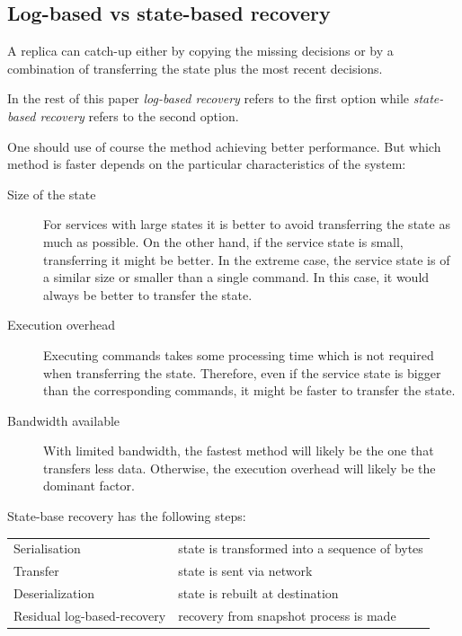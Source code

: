 \subsection{Log-based vs state-based recovery}
\label{subsec:log_based_state_based_recovery}
A replica can catch-up either by copying the missing decisions or by a combination of transferring the state plus the most recent decisions.

In the rest of this paper \emph{log-based recovery} refers to the first option while \emph{state-based recovery} refers to the second option.

One should use of course the method achieving better performance. But which method is faster depends on the particular characteristics of the system:

\begin{description}
  \item[Size of the state] For services with large states  it is better to avoid transferring the state as much as possible. On the other hand, if the service state is small, transferring it might be better. In the extreme case, the service state is of a similar size or smaller than a single command. In this case, it would always be better to transfer the state.

  \item[Execution overhead] Executing commands takes some processing time which is not required when transferring the state. Therefore, even if the service state is bigger than the corresponding commands, it might be faster to transfer the state.

  \item[Bandwidth available] With limited bandwidth, the fastest  method will likely be the one that transfers less data. Otherwise, the execution overhead will likely be the dominant factor.
\end{description}


State-base recovery has the following steps:

\begin{center}
  \begin{tabular}{ll}
    Serialisation               & state is transformed into a sequence of bytes \\
    Transfer                    & state is sent via network \\
    Deserialization             & state is rebuilt at destination \vspace{0.5em} \\
    Residual log-based-recovery & recovery from snapshot process is made \\
  \end{tabular}
\end{center}

